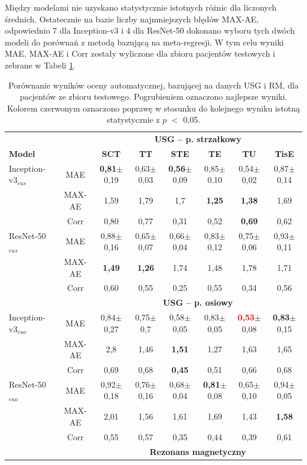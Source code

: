 Między modelami nie uzyskano statystycznie istotnych różnic  dla liczonych średnich. Ostatecznie na bazie liczby najmniejszych błędów MAX-AE, odpowiednio 7 dla Inception-v3 i 4 dla ResNet-50 dokonano wyboru tych dwóch modeli do porównań z metodą bazującą na meta-regresji. W tym celu wyniki MAE, MAX-AE i Corr zostały wyliczone dla zbioru pacjentów testowych i zebrane w Tabeli \ref{tab:USGvsRM-cross-validation}.
\vspace{6px}
\renewcommand{\arraystretch}{1.2}
\begin{table}[h]
	\scriptsize
	\setlength{\tabcolsep}{1pt}
	\centering
	\caption{Porównanie wyników oceny automatycznej, bazującej na danych USG i RM, dla pacjentów ze zbioru testowego. Pogrubieniem oznaczono najlepsze wyniki. Kolorem czerwonym oznaczono poprawę w stosunku do kolejnego wyniku istotną statystycznie z $p$ $<$ 0,05.}
	\label{tab:USGvsRM-cross-validation}
	\vspace{-0.5cm}
	\begin{tabular}{lc||c|c|c|c|c|c}
		& & \multicolumn{6}{c}{\textbf{USG -- p. strzałkowy}} \\
		\textbf{Model} & & \textbf{SCT} & \textbf{TT} & \textbf{STE} & \textbf{TE} & \textbf{TU} & \textbf{TisE} \\ \hline \hline
		Inception-v3$_{eus}$ & MAE & \textbf{0,81}$\pm$0,19 & 0,63$\pm$0,03 & \textbf{0,56}$\pm$0,09 & 0,85$\pm$0,10 & 0,54$\pm$0,02 & 0,87$\pm$0,14 \\
		& MAX-AE & 1,59 & 1,79 & 1,7 & \textbf{1,25} & \textbf{1,38} & 1,69 \\
		& Corr & 0,80 & 0,77 & 0,31 & 0,52 & \textbf{0,69} & 0,62 \\ \hline
		ResNet-50$_{eus}$ & MAE & 0,88$\pm$0,16 & 0,65$\pm$0,07 & 0,66$\pm$0,04 & 0,83$\pm$0,12 & 0,75$\pm$0,06 & 0,93$\pm$0,11 \\
		& MAX-AE & \textbf{1,49} & \textbf{1,26} & 1,74 & 1,48 & 1,78 & 1,71 \\
		& Corr & 0,60 & 0,55 & 0,25 & 0,55 & 0,34 & 0,56 \\
		\hline \hline
		& & \multicolumn{6}{c}{\textbf{USG -- p. osiowy}} \\
		
		Inception-v3$_{euo}$ & MAE & 0,84$\pm$0,27 & 0,75$\pm$0,7 & 0,58$\pm$0,05 & 0,83$\pm$0,05 & \textcolor{red}{\textbf{0,53}}$\pm$0,08 & \textbf{0,83}$\pm$0,15 \\
		& MAX-AE & 2,8 & 1,46 & \textbf{1,51} & 1,27 & 1,63 & 1,65 \\
		& Corr & 0,69 & 0,68 & \textbf{0,45} & 0,51 & 0,66 & 0,68 \\ \hline
		ResNet-50$_{euo}$ & MAE & 0,92$\pm$0,18 & 0,76$\pm$0,16 & 0,68$\pm$0,04 & \textbf{0,81}$\pm$0,08 & 0,65$\pm$0,10 & 0,94$\pm$0,05 \\
		& MAX-AE & 2,01 & 1,56 & 1,61 & 1,69& 1,43 & \textbf{1,58}\\
		& Corr & 0,55 & 0,57 & 0,35 & 0,44 & 0,39 & 0,61 \\ \hline \hline
		& & \multicolumn{6}{c}{\textbf{Rezonans magnetyczny}} \\
		

\end{tabular}
\end{table}
